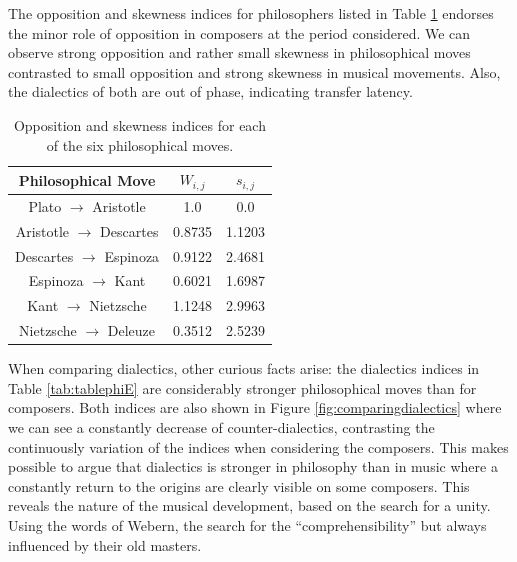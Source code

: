 \documentclass[
 aip,
 jmp,
 amsmath,amssymb,
 reprint,
]{revtex4-1}
\begin{document}
The opposition and skewness indices for philosophers listed in Table
\ref{tab:tablephiOI} endorses the minor role of opposition in
composers at the period considered. We can observe strong opposition and rather small skewness 
in philosophical moves contrasted to small opposition and strong skewness in
musical movements. Also, the dialectics of both are out of
phase, indicating transfer latency. 

\begin{table}%
\caption{\label{tab:tablephiOI}Opposition and skewness indices for each
of the six philosophical moves.}

\begin{tabular}{|c||c|c|}
\hline
Philosophical Move & $W_{i,j}$ & $s_{i,j}$ \\
\hline \hline
Plato $\rightarrow$ Aristotle     & 1.0    & 0.0 \\
Aristotle $\rightarrow$ Descartes & 0.8735 & 1.1203 \\
Descartes $\rightarrow$ Espinoza  & 0.9122 & 2.4681 \\
Espinoza $\rightarrow$ Kant       & 0.6021 & 1.6987 \\
Kant $\rightarrow$ Nietzsche      & 1.1248 & 2.9963 \\
Nietzsche $\rightarrow$ Deleuze   & 0.3512 & 2.5239 \\
\hline
\end{tabular}
\end{table}

When comparing dialectics, other curious facts arise: the dialectics
indices in Table \ref{tab:tablephiE} are considerably stronger philosophical moves than for
composers. Both indices are also shown in Figure
\ref{fig:comparingdialectics} where we can see a constantly decrease
of counter-dialectics, contrasting the continuously variation of the
indices when considering the composers. This makes possible to argue
that dialectics is stronger in philosophy than in music where a
constantly return to the origins are clearly visible on some
composers. This reveals the nature of the
musical development, based on the search for a unity. Using the words
of Webern, the search for the ``comprehensibility'' but always
influenced by their old masters.
\end{document}
